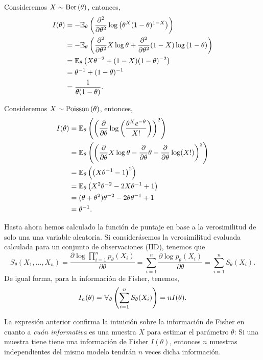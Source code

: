 \begin{exercise}
	Consideremos $X\sim\text{Ber}\left(\theta\right)$, entonces, 
	\begin{align}
		I(\theta) &= -\mathbb{E}_\theta \left(\frac{\partial^2}{\partial\theta^2}\log\left(\theta^X(1-\theta)^{1-X}\right)\right)\nonumber\\
		&= -\mathbb{E}_\theta \left(\frac{\partial^2}{\partial\theta^2} X\log\theta + \frac{\partial^2}{\partial\theta^2} 	(1-X)\log\left(1-\theta\right)	\right)\nonumber\\
		&= \mathbb{E}_\theta \left(X\theta^{-2} + (1-X)(1-\theta)^{-2}	\right)\nonumber\\
		&= \theta^{-1} + (1-\theta)^{-1}	\nonumber\\
		&= 	\frac{1}{\theta(1-\theta)}.
	\end{align}
\end{exercise}

\begin{exercise}
	Consideremos $X\sim\text{Poisson}\left(\theta\right)$, entonces, 
	\begin{align}
		I(\theta) &= \mathbb{E}_\theta \left(\left(\frac{\partial}{\partial\theta}\log\left(\frac{\theta^Xe^{-\theta}}{X!}\right)\right)^2\right)\nonumber	\\
		&= \mathbb{E}_\theta \left(\left( \frac{\partial}{\partial\theta}X\log\theta - \frac{\partial}{\partial\theta}\theta - \frac{\partial}{\partial\theta}\log(X!)\right)^2\right)\nonumber\\
		&= \mathbb{E}_\theta \left(\left( X\theta^{-1} - 1\right)^2\right)\nonumber	\\
		&= \mathbb{E}_\theta \left( X^2\theta^{-2} -2X\theta^{-1}+ 1\right)\nonumber	\\
		&= (\theta+\theta^2)\theta^{-2} -2\theta\theta^{-1}+ 1\nonumber\\
		&= \theta^{-1}.\nonumber	
	\end{align}
\end{exercise}

Hasta ahora hemos calculado la función de puntaje en base a la verosimilitud de solo una una variable aleatoria. Si considerásemos la verosimilitud evaluada calculada para un conjunto de observaciones (IID), tenemos que
\begin{equation}
	S_\theta(X_1,\ldots,X_n) = \frac{\partial \log \prod_{i=1}^np_\theta(X_i)}{\partial\theta} = \sum_{i=1}^n\frac{\partial \log p_\theta(X_i)}{\partial\theta}= \sum_{i=1}^n S_\theta(X_i).
\end{equation}
De igual forma, para la información de Fisher, tenemos, 
\begin{equation}
	I_n(\theta) = \mathbb{V}_\theta \left(\sum_{i=1}^n S_\theta(X_i)\right) = n I(\theta).
\end{equation}
\begin{remark}
La expresión anterior confirma la intuición sobre la información de Fisher en cuanto a \emph{cuán informativa} es una muestra $X$ para estimar el parámetro $\theta$: Si una muestra tiene tiene una información de Fisher $I(\theta)$, entonces $n$ muestras independientes del mismo modelo tendrán  $n$ veces dicha información. 
\end{remark}

